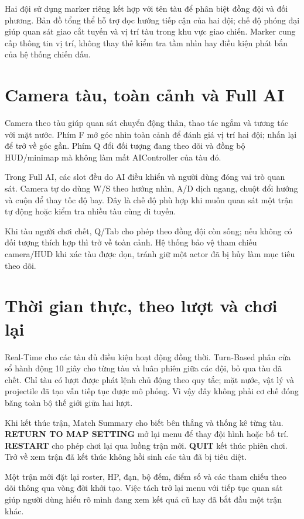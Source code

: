 \documentclass[11pt,a4paper,oneside]{report}
\begin{document}
Hai đội sử dụng marker riêng kết hợp với tên tàu để phân biệt đồng đội và đối phương. Bản đồ tổng thể hỗ trợ đọc hướng tiếp cận của hai đội; chế độ phóng đại giúp quan sát giao cắt tuyến và vị trí tàu trong khu vực giao chiến. Marker cung cấp thông tin vị trí, không thay thế kiểm tra tầm nhìn hay điều kiện phát bắn của hệ thống chiến đấu.


\section{Camera tàu, toàn cảnh và Full AI}
Camera theo tàu giúp quan sát chuyển động thân, thao tác ngắm và tương tác với mặt nước. Phím F mở góc nhìn toàn cảnh để đánh giá vị trí hai đội; nhấn lại để trở về góc gần. Phím Q đổi đối tượng đang theo dõi và đồng bộ HUD/minimap mà không làm mất AIController của tàu đó.

Trong Full AI, các slot đều do AI điều khiển và người dùng đóng vai trò quan sát. Camera tự do dùng W/S theo hướng nhìn, A/D dịch ngang, chuột đổi hướng và cuộn để thay tốc độ bay. Đây là chế độ phù hợp khi muốn quan sát một trận tự động hoặc kiểm tra nhiều tàu cùng đi tuyến.

Khi tàu người chơi chết, Q/Tab cho phép theo đồng đội còn sống; nếu không có đối tượng thích hợp thì trở về toàn cảnh. Hệ thống bảo vệ tham chiếu camera/HUD khi xác tàu được dọn, tránh giữ một actor đã bị hủy làm mục tiêu theo dõi.

\clearpage\section{Thời gian thực, theo lượt và chơi lại}
Real-Time cho các tàu đủ điều kiện hoạt động đồng thời. Turn-Based phân cửa sổ hành động 10 giây cho từng tàu và luân phiên giữa các đội, bỏ qua tàu đã chết. Chỉ tàu có lượt được phát lệnh chủ động theo quy tắc; mặt nước, vật lý và projectile đã tạo vẫn tiếp tục được mô phỏng. Vì vậy đây không phải cơ chế đóng băng toàn bộ thế giới giữa hai lượt.

Khi kết thúc trận, Match Summary cho biết bên thắng và thống kê từng tàu. \textbf{RETURN TO MAP SETTING} mở lại menu để thay đội hình hoặc bố trí. \textbf{RESTART} cho phép chơi lại qua luồng trận mới. \textbf{QUIT} kết thúc phiên chơi. Trở về xem trận đã kết thúc không hồi sinh các tàu đã bị tiêu diệt.

Một trận mới đặt lại roster, HP, đạn, bộ đếm, điểm số và các tham chiếu theo dõi thông qua vòng đời khởi tạo. Việc tách trở lại menu với tiếp tục quan sát giúp người dùng hiểu rõ mình đang xem kết quả cũ hay đã bắt đầu một trận khác.
\end{document}
